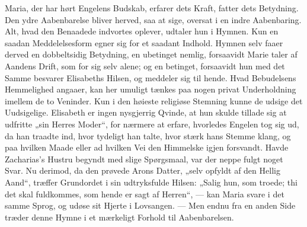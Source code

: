 \documentclass[12pt,a4paper]{book}
\begin{document}
Maria, der har hørt Engelens Budskab, erfarer dets Kraft, fatter dets Betydning.
Den ydre Aabenbarelse bliver herved, saa at sige, oversat i en indre Aabenbaring.
Alt, hvad den Benaadede indvortes oplever, udtaler hun i Hymnen. Kun en saadan
Meddelelsesform egner sig for et saadant Indhold. Hymnen selv faaer derved en
dobbeltsidig Betydning, en ubetinget nemlig, forsaavidt Marie taler af Aandens
Drift, som for sig selv alene; og en betinget, forsaavidt hun med det Samme
besvarer Elisabeths Hilsen, og meddeler sig til hende. Hvad Bebudelsens
Hemmelighed angaaer, kan her umuligt tænkes paa nogen privat Underholdning
imellem de to Veninder. Kun i den høieste religiøse Stemning kunne de udsige det
Uudsigelige. Elisabeth er ingen nysgjerrig Qvinde, at hun skulde tillade sig at
udfritte „sin Herres Moder“, for nærmere at erfare, hvorledes Engelen tog sig ud,
da han traadte ind, hvor tydeligt han talte, hvor stærk hans Stemme klang, og paa
hvilken Maade eller ad hvilken Vei den Himmelske igjen forsvandt. Havde
Zacharias's Hustru begyndt med slige Spørgsmaal, var der neppe fulgt noget Svar.
Nu derimod, da den prøvede Arons Datter, „selv opfyldt af den Hellig Aand“,
træffer Grundordet i sin udtryksfulde Hilsen: „Salig hun, som troede; thi det
skal fuldkommes, som hende er sagt af Herren“, --- kan Maria svare i det samme
Sprog, og udøse sit Hjerte i Lovsangen. --- Men endnu fra en anden Side træder
denne Hymne i et mærkeligt Forhold til Aabenbarelsen.
\end{document}
